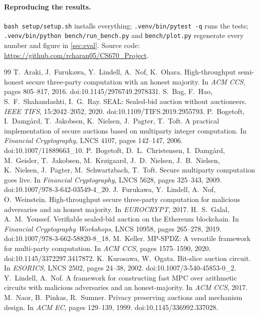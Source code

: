\documentclass[11pt,a4paper]{article}
\newcommand{\code}[1]{\texttt{#1}}
\begin{document}
\paragraph{Reproducing the results.}
\code{bash setup/setup.sh} installs everything; \code{.venv/bin/pytest -q} runs the tests;
\code{.venv/bin/python bench/run\_bench.py} and \code{bench/plot.py} regenerate every number and
figure in \cref{sec:eval}. Source code: \url{https://github.com/rcharan05/CS670_Project}.

\begin{thebibliography}{99}\small
{} T.~Araki, J.~Furukawa, Y.~Lindell, A.~Nof, K.~Ohara.
  High-throughput semi-honest secure three-party computation with an honest majority.
  In \emph{ACM CCS}, pages 805--817, 2016. doi:10.1145/2976749.2978331.
 S.~Bag, F.~Hao, S.~F.~Shahandashti, I.~G.~Ray.
  SEAL: Sealed-bid auction without auctioneers.
  \emph{IEEE TIFS}, 15:2042--2052, 2020. doi:10.1109/TIFS.2019.2955793.
 P.~Bogetoft, I.~Damg{\aa}rd, T.~Jakobsen, K.~Nielsen, J.~Pagter, T.~Toft.
  A practical implementation of secure auctions based on multiparty integer computation.
  In \emph{Financial Cryptography}, LNCS 4107, pages 142--147, 2006. doi:10.1007/11889663\_10.
 P.~Bogetoft, D.~L.~Christensen, I.~Damg{\aa}rd, M.~Geisler, T.~Jakobsen,
  M.~Kr{\o}igaard, J.~D.~Nielsen, J.~B.~Nielsen, K.~Nielsen, J.~Pagter, M.~Schwartzbach, T.~Toft.
  Secure multiparty computation goes live.
  In \emph{Financial Cryptography}, LNCS 5628, pages 325--343, 2009.
  doi:10.1007/978-3-642-03549-4\_20.
 J.~Furukawa, Y.~Lindell, A.~Nof, O.~Weinstein.
  High-throughput secure three-party computation for malicious adversaries and an honest majority.
  In \emph{EUROCRYPT}, 2017.
 H.~S.~Galal, A.~M.~Youssef.
  Verifiable sealed-bid auction on the Ethereum blockchain.
  In \emph{Financial Cryptography Workshops}, LNCS 10958, pages 265--278, 2019.
  doi:10.1007/978-3-662-58820-8\_18.
 M.~Keller.
  MP-SPDZ: A versatile framework for multi-party computation.
  In \emph{ACM CCS}, pages 1575--1590, 2020. doi:10.1145/3372297.3417872.
 K.~Kurosawa, W.~Ogata.
  Bit-slice auction circuit.
  In \emph{ESORICS}, LNCS 2502, pages 24--38, 2002. doi:10.1007/3-540-45853-0\_2.
 Y.~Lindell, A.~Nof.
  A framework for constructing fast MPC over arithmetic circuits with malicious adversaries and an
  honest-majority. In \emph{ACM CCS}, 2017.
 M.~Naor, B.~Pinkas, R.~Sumner.
  Privacy preserving auctions and mechanism design.
  In \emph{ACM EC}, pages 129--139, 1999. doi:10.1145/336992.337028.
\end{thebibliography}
\end{document}
